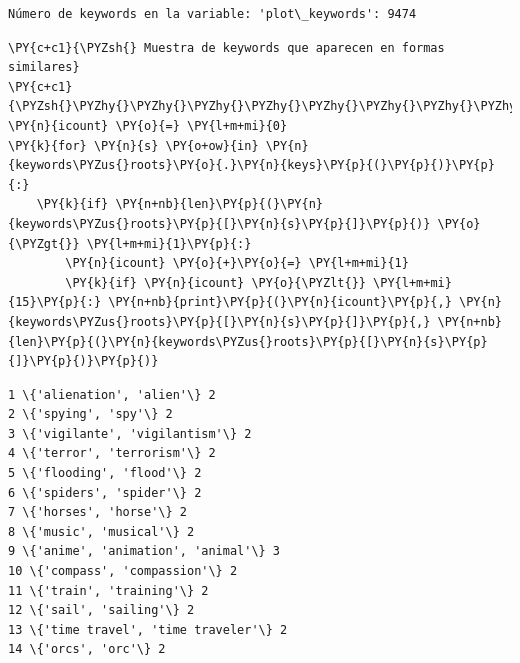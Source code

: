     \begin{Verbatim}[commandchars=\\\{\}]
Número de keywords en la variable: 'plot\_keywords': 9474
\end{Verbatim}

    \begin{tcolorbox}[breakable, size=fbox, boxrule=1pt, pad at break*=1mm,colback=cellbackground, colframe=cellborder]
\begin{Verbatim}[commandchars=\\\{\}]
\PY{c+c1}{\PYZsh{} Muestra de keywords que aparecen en formas similares}
\PY{c+c1}{\PYZsh{}\PYZhy{}\PYZhy{}\PYZhy{}\PYZhy{}\PYZhy{}\PYZhy{}\PYZhy{}\PYZhy{}\PYZhy{}\PYZhy{}\PYZhy{}\PYZhy{}\PYZhy{}\PYZhy{}\PYZhy{}\PYZhy{}\PYZhy{}\PYZhy{}\PYZhy{}\PYZhy{}\PYZhy{}\PYZhy{}\PYZhy{}\PYZhy{}\PYZhy{}\PYZhy{}\PYZhy{}\PYZhy{}\PYZhy{}\PYZhy{}\PYZhy{}\PYZhy{}\PYZhy{}\PYZhy{}\PYZhy{}\PYZhy{}\PYZhy{}\PYZhy{}\PYZhy{}\PYZhy{}\PYZhy{}\PYZhy{}\PYZhy{}\PYZhy{}\PYZhy{}\PYZhy{}\PYZhy{}\PYZhy{}\PYZhy{}\PYZhy{}\PYZhy{}\PYZhy{}\PYZhy{}\PYZhy{}\PYZhy{}\PYZhy{}\PYZhy{}\PYZhy{}\PYZhy{}\PYZhy{}}
\PY{n}{icount} \PY{o}{=} \PY{l+m+mi}{0}
\PY{k}{for} \PY{n}{s} \PY{o+ow}{in} \PY{n}{keywords\PYZus{}roots}\PY{o}{.}\PY{n}{keys}\PY{p}{(}\PY{p}{)}\PY{p}{:}
    \PY{k}{if} \PY{n+nb}{len}\PY{p}{(}\PY{n}{keywords\PYZus{}roots}\PY{p}{[}\PY{n}{s}\PY{p}{]}\PY{p}{)} \PY{o}{\PYZgt{}} \PY{l+m+mi}{1}\PY{p}{:} 
        \PY{n}{icount} \PY{o}{+}\PY{o}{=} \PY{l+m+mi}{1}
        \PY{k}{if} \PY{n}{icount} \PY{o}{\PYZlt{}} \PY{l+m+mi}{15}\PY{p}{:} \PY{n+nb}{print}\PY{p}{(}\PY{n}{icount}\PY{p}{,} \PY{n}{keywords\PYZus{}roots}\PY{p}{[}\PY{n}{s}\PY{p}{]}\PY{p}{,} \PY{n+nb}{len}\PY{p}{(}\PY{n}{keywords\PYZus{}roots}\PY{p}{[}\PY{n}{s}\PY{p}{]}\PY{p}{)}\PY{p}{)}
\end{Verbatim}
\end{tcolorbox}

    \begin{Verbatim}[commandchars=\\\{\}]
1 \{'alienation', 'alien'\} 2
2 \{'spying', 'spy'\} 2
3 \{'vigilante', 'vigilantism'\} 2
4 \{'terror', 'terrorism'\} 2
5 \{'flooding', 'flood'\} 2
6 \{'spiders', 'spider'\} 2
7 \{'horses', 'horse'\} 2
8 \{'music', 'musical'\} 2
9 \{'anime', 'animation', 'animal'\} 3
10 \{'compass', 'compassion'\} 2
11 \{'train', 'training'\} 2
12 \{'sail', 'sailing'\} 2
13 \{'time travel', 'time traveler'\} 2
14 \{'orcs', 'orc'\} 2
\end{Verbatim}


